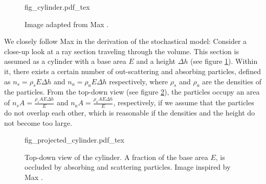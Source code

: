 \begin{figure}
\centering
\def\svgwidth{\columnwidth}
{fig_cylinder.pdf_tex}

\caption{Image adapted from Max \cite{468400}.}
\label{fig:cylinder}
\end{figure}
We closely follow Max\cite{468400} in the derivation of the stochastical model: Consider a close-up look at a ray section traveling through the volume. This section is assumed as a cylinder with a base area $E$ and a height $\Delta h$ (see figure \ref{fig:cylinder}). Within it, there exists a certain number of out-scattering and absorbing particles, defined as $n_s={\rho}_sE{\Delta}h$ and $n_a={\rho}_aE{\Delta}h$ respectively, where ${\rho}_s$ and ${\rho}_a$ are the densities of the particles. From the top-down view (see figure \ref{fig:projected_cylinder}), the particles occupy an area of ${n_sA}=\frac{{\rho}_sAE{\Delta}h}{E}$ and ${n_aA}=\frac{{\rho}_aAE{\Delta}h}{E}$, respectively, if we assume that the particles do not overlap each other, which is reasonable if the densities and the height do not become too large.



\begin{figure}
\centering
\def\svgwidth{\columnwidth}
{fig_projected_cylinder.pdf_tex}

\caption{Top-down view of the cylinder. A fraction of the base area $E$, is occluded by absorbing and scattering particles. Image inspired by Max \cite{468400}.}
\label{fig:projected_cylinder}
\end{figure}

